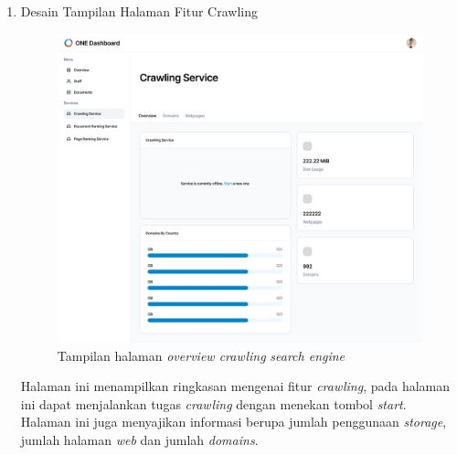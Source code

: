 \begin{enumerate}[label=\alph*)., leftmargin=1\parindent]
	\item{Desain Tampilan Halaman Fitur Crawling}
	\begin{figure}[H]
		\centering
		\includegraphics[keepaspectratio, width=13cm]{gambar/uiux_crawling_overview.png}
		\caption{Tampilan halaman \textit{overview crawling} \textit{search engine}}
		\label{gambar:uiux_crawling_overview.png}
	\end{figure}

	Halaman ini menampilkan ringkasan mengenai fitur \textit{crawling}, pada halaman ini dapat menjalankan tugas \textit{crawling} dengan menekan tombol \textit{start}. Halaman ini juga menyajikan informasi berupa jumlah penggunaan \textit{storage}, jumlah halaman \textit{web} dan jumlah \textit{domains}.


\end{enumerate}
